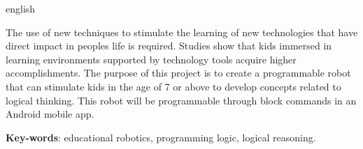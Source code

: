 \begin{resumo}[Abstract]
 \begin{otherlanguage*}{english}

  The use of new techniques to stimulate the learning of new technologies that have direct impact in peoples life is required. Studies show that kids immersed in learning environments supported by technology tools acquire higher accomplishments. The purpose of this project is to create a programmable robot that can stimulate kids in the age of 7 or above to develop concepts related to logical thinking. This robot will be programmable through block commands in an Android mobile app.

   \vspace{\onelineskip}
 
   \noindent 
   \textbf{Key-words}: educational robotics, programming logic, logical reasoning.
 \end{otherlanguage*}
\end{resumo}
